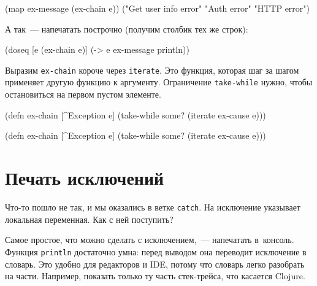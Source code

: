 \else

\begin{english}
  \begin{clojure}
(map ex-message (ex-chain e))
("Get user info error" "Auth error" "HTTP error")
  \end{clojure}
\end{english}

\fi

\noindent
А так~--- напечатать построчно (получим столбик тех же строк):


\begin{english}
  \begin{clojure}
(doseq [e (ex-chain e)]
  (-> e ex-message println))
  \end{clojure}
\end{english}

Выразим \verb|ex-chain| короче через \verb|iterate|. Это функция, которая
шаг за шагом применяет другую функцию к аргументу. Ограничение
\verb|take-while| нужно, чтобы остановиться на первом пустом элементе.

\ifx\DEVICETYPE\MOBILE

\begin{english}
  \begin{clojure}
(defn ex-chain [^Exception e]
  (take-while some?
    (iterate ex-cause e)))
  \end{clojure}
\end{english}

\else

\begin{english}
  \begin{clojure}
(defn ex-chain [^Exception e]
  (take-while some? (iterate ex-cause e)))
  \end{clojure}
\end{english}

\fi

\section{Печать исключений}

Что-то пошло не так, и мы оказались в ветке \verb|catch|. На исключение
указывает локальная переменная. Как с ней поступить?

Самое простое, что можно сделать с исключением,~--- напечатать в~консоль. Функция
\verb|println| достаточно умна: перед выводом она переводит исключение в
словарь. Это удобно для редакторов и IDE, потому что словарь легко разобрать на
части. Например, показать только ту часть стек-трейса, что касается Clojure.


